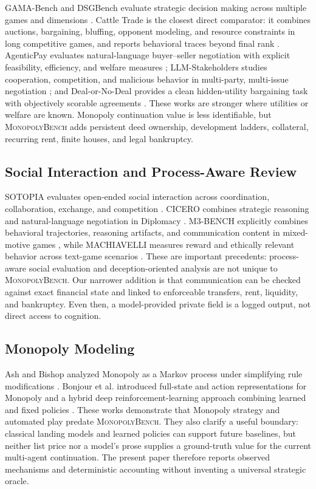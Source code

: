 \documentclass[conference]{IEEEtran}
\newcommand{\Bench}{\textsc{MonopolyBench}\xspace}
\begin{document}
GAMA-Bench and DSGBench evaluate strategic decision making across multiple games and dimensions \cite{gamabench,dsgbench}. Cattle Trade is the closest direct comparator: it combines auctions, bargaining, bluffing, opponent modeling, and resource constraints in long competitive games, and reports behavioral traces beyond final rank \cite{cattletrade}. AgenticPay evaluates natural-language buyer--seller negotiation with explicit feasibility, efficiency, and welfare measures \cite{agenticpay}; LLM-Stakeholders studies cooperation, competition, and malicious behavior in multi-party, multi-issue negotiation \cite{stakeholders}; and Deal-or-No-Deal provides a clean hidden-utility bargaining task with objectively scorable agreements \cite{dealornodeal}. These works are stronger where utilities or welfare are known. Monopoly continuation value is less identifiable, but \Bench adds persistent deed ownership, development ladders, collateral, recurring rent, finite houses, and legal bankruptcy.

\subsection{Social Interaction and Process-Aware Review}

SOTOPIA evaluates open-ended social interaction across coordination, collaboration, exchange, and competition \cite{sotopia}. CICERO combines strategic reasoning and natural-language negotiation in Diplomacy \cite{cicero}. M3-BENCH explicitly combines behavioral trajectories, reasoning artifacts, and communication content in mixed-motive games \cite{m3bench}, while MACHIAVELLI measures reward and ethically relevant behavior across text-game scenarios \cite{machiavelli}. These are important precedents: process-aware social evaluation and deception-oriented analysis are not unique to \Bench. Our narrower addition is that communication can be checked against exact financial state and linked to enforceable transfers, rent, liquidity, and bankruptcy. Even then, a model-provided private field is a logged output, not direct access to cognition.

\subsection{Monopoly Modeling}

Ash and Bishop analyzed Monopoly as a Markov process under simplifying rule modifications \cite{ash_bishop}. Bonjour et al. introduced full-state and action representations for Monopoly and a hybrid deep reinforcement-learning approach combining learned and fixed policies \cite{bonjour_monopoly}. These works demonstrate that Monopoly strategy and automated play predate \Bench. They also clarify a useful boundary: classical landing models and learned policies can support future baselines, but neither list price nor a model's prose supplies a ground-truth value for the current multi-agent continuation. The present paper therefore reports observed mechanisms and deterministic accounting without inventing a universal strategic oracle.
\end{document}
